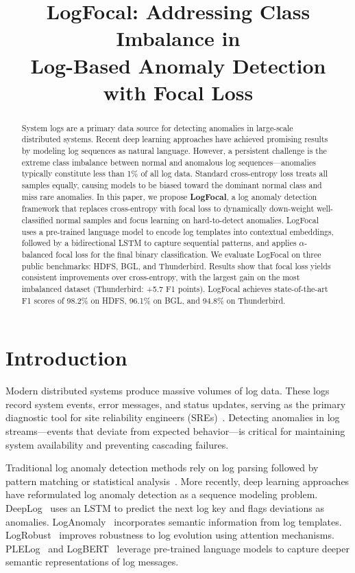 \documentclass[conference]{IEEEtran}
\title{LogFocal: Addressing Class Imbalance in\\Log-Based Anomaly Detection\\with Focal Loss}
\author{
\IEEEauthorblockN{Yichen Zhang\IEEEauthorrefmark{1}, Maria Chen\IEEEauthorrefmark{1}, Kenji Tanaka\IEEEauthorrefmark{2}}
\IEEEauthorblockA{\IEEEauthorrefmark{1}Department of Computer Science, University of Waterloo, Canada}
\IEEEauthorblockA{\IEEEauthorrefmark{2}NTT Research, Tokyo, Japan}
}
\begin{document}
\maketitle

\begin{abstract}
System logs are a primary data source for detecting anomalies in large-scale distributed systems.
Recent deep learning approaches have achieved promising results by modeling log sequences as natural language.
However, a persistent challenge is the extreme class imbalance between normal and anomalous log sequences---anomalies
typically constitute less than 1\% of all log data.
Standard cross-entropy loss treats all samples equally,
causing models to be biased toward the dominant normal class and miss rare anomalies.
In this paper, we propose \textbf{LogFocal},
a log anomaly detection framework that replaces cross-entropy with focal loss
to dynamically down-weight well-classified normal samples and focus learning on hard-to-detect anomalies.
LogFocal uses a pre-trained language model to encode log templates into contextual embeddings,
followed by a bidirectional LSTM to capture sequential patterns,
and applies $\alpha$-balanced focal loss for the final binary classification.
We evaluate LogFocal on three public benchmarks: HDFS, BGL, and Thunderbird.
Results show that focal loss yields consistent improvements over cross-entropy,
with the largest gain on the most imbalanced dataset (Thunderbird: +5.7 F1 points).
LogFocal achieves state-of-the-art F1 scores of 98.2\% on HDFS, 96.1\% on BGL, and 94.8\% on Thunderbird.
\end{abstract}

\section{Introduction}\label{sec:intro}

Modern distributed systems produce massive volumes of log data.
These logs record system events, error messages, and status updates,
serving as the primary diagnostic tool for site reliability engineers (SREs)~\cite{he2021survey}.
Detecting anomalies in log streams---events that deviate from expected behavior---is critical
for maintaining system availability and preventing cascading failures.

Traditional log anomaly detection methods rely on log parsing followed by pattern matching
or statistical analysis~\cite{xu2009detecting,lou2010mining}.
More recently, deep learning approaches have reformulated log anomaly detection
as a sequence modeling problem.
DeepLog~\cite{du2017deeplog} uses an LSTM to predict the next log key and flags deviations as anomalies.
LogAnomaly~\cite{meng2019loganomaly} incorporates semantic information from log templates.
LogRobust~\cite{zhang2019robust} improves robustness to log evolution using attention mechanisms.
PLELog~\cite{yang2021plelog} and LogBERT~\cite{guo2021logbert} leverage pre-trained language models
to capture deeper semantic representations of log messages.
\end{document}
